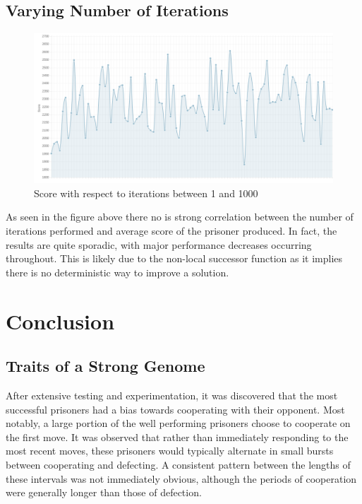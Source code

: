 \documentclass[12pt]{article}
\begin{document}
\subsection{Varying Number of Iterations}
\begin{figure}[h]
    \centering
    \includegraphics[scale=0.4]{figures/hill_climb.png}
    \caption{Score with respect to iterations between 1 and 1000}
\end{figure}

As seen in the figure above there no is strong correlation between the number
of iterations performed and average score of the prisoner produced.  In fact, the results
are quite sporadic, with major performance decreases occurring throughout.  This is
likely due to the non-local successor function as it implies there is no deterministic way
to improve a solution.

\pagebreak

\section{Conclusion}

\subsection{Traits of a Strong Genome}
After extensive testing and experimentation, it was discovered that the most successful prisoners
had a bias towards cooperating with their opponent. Most notably, a large portion of
the well performing prisoners choose to cooperate on the first move.
It was observed that rather than immediately responding to the most recent moves, these prisoners would
typically alternate in small bursts between cooperating and defecting. A consistent
pattern between the lengths of these intervals was not immediately obvious, although
the periods of cooperation were generally longer than those of defection.
\end{document}
